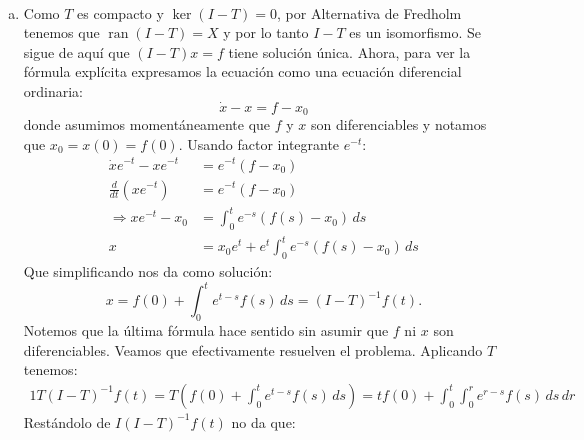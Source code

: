 \documentclass[11pt]{article}
\newenvironment{Solucion}[1][]
{%
  \newline
	\noindent{\ttfamily SOLUCIÓN}~
}%
{%
}
\DeclareMathOperator{\ran}{ran}
\begin{document}
\begin{Solucion}
\begin{enumerate}[(a)]
  \item Como \(T\) es compacto y \(\ker(I-T) = 0\), por Alternativa de Fredholm tenemos
    que \(\ran(I-T) = X\) y por lo tanto \(I-T\) es un isomorfismo. Se sigue de aquí que
    \((I-T)x = f\) tiene solución única. 
    Ahora, para ver la fórmula explícita expresamos la ecuación como una ecuación diferencial
    ordinaria:
    \begin{displaymath}
      \dot x - x = f - x_0
    \end{displaymath}
    donde asumimos momentáneamente que \(f\) y \(x\) son diferenciables y notamos que \(x_0 = x(0) = f(0)\).
    Usando factor integrante \(e^{-t}\):
    \begin{align*}
      \dot x e^{-t} - x e^{-t} &= e^{-t} (f-x_0)\\
      \frac{d}{dt} (x e^{-t})  &= e^{-t} (f-x_0)\\
      \Rightarrow
      x e^{-t} - x_0 &= \int_{0}^{t} e^{-s} (f(s) - x_0)\, ds\\
      x &= x_0 e^{t} + e^{t} \int_0^t e^{-s} (f(s) - x_0)\, ds
    \end{align*}
    Que simplificando nos da como solución:
    \begin{displaymath}
      x
      = f(0) + \int_{0}^{t} e^{t-s} f(s) \, ds
      = (I-T)^{-1}f(t).
    \end{displaymath}
    Notemos que la última fórmula hace sentido sin asumir que \(f\) ni \(x\) son diferenciables.
    Veamos que efectivamente resuelven el problema. Aplicando \(T\) tenemos: 
    \begin{alignat*}{1}
      T (I-T)^{-1} f (t)
      =
      T \left( f(0) + \int_0^t e^{t-s} f(s) \,ds \right)
      =
      t f(0) + \int_0^t \int_0^r e^{r-s} f(s) \,ds\, dr
    \end{alignat*}
    Restándolo de \(I(I-T)^{-1}f(t)\) no da que:
\end{enumerate}
\end{Solucion}
\end{document}
